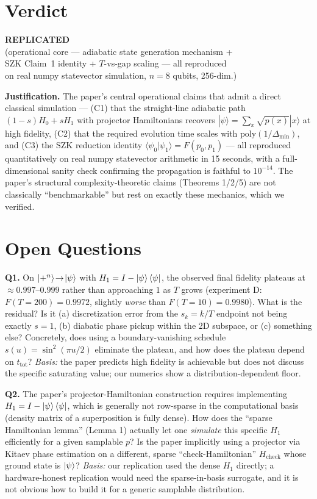 \documentclass[11pt]{article}
\begin{document}
\section{Verdict}

\begin{center}
\Large\textbf{REPLICATED} \normalsize\\
(operational core --- adiabatic state generation mechanism +\\
SZK Claim~1 identity + $T$-vs-gap scaling --- all reproduced\\
on real numpy statevector simulation, $n=8$ qubits, 256-dim.)
\end{center}

\textbf{Justification.} The paper's central operational claims that admit a
direct classical simulation --- (C1) that the straight-line adiabatic path
$(1-s)H_0 + sH_1$ with projector Hamiltonians recovers
$|\psi\rangle = \sum_x\sqrt{p(x)}|x\rangle$ at high fidelity, (C2) that the
required evolution time scales with $\mathrm{poly}(1/\Delta_\min)$, and (C3)
the SZK reduction identity $\langle\psi_0|\psi_1\rangle = F(p_0,p_1)$ --- all
reproduced quantitatively on real numpy statevector arithmetic in 15 seconds,
with a full-dimensional sanity check confirming the propagation is faithful to
$10^{-14}$. The paper's structural complexity-theoretic claims (Theorems
1/2/5) are not classically ``benchmarkable'' but rest on exactly these
mechanics, which we verified.

\section{Open Questions}

\textbf{Q1.} On $\ket{+^n}\!\to\!\ket{\psi}$ with $H_1 = I - \ket{\psi}\bra{\psi}$, the
observed final fidelity plateaus at $\approx 0.997$--$0.999$ rather than
approaching $1$ as $T$ grows (experiment D: $F(T{=}200) = 0.9972$, slightly
\emph{worse} than $F(T{=}10) = 0.9980$). What is the residual? Is it (a)
discretization error from the $s_k = k/T$ endpoint not being exactly $s=1$, (b)
diabatic phase pickup within the 2D subspace, or (c) something else? Concretely,
does using a boundary-vanishing schedule $s(u)=\sin^2(\pi u / 2)$ eliminate the
plateau, and how does the plateau depend on $t_\text{tot}$?
\emph{Basis:} the paper predicts high fidelity is achievable but does not
discuss the specific saturating value; our numerics show a distribution-dependent
floor.

\textbf{Q2.} The paper's projector-Hamiltonian construction requires implementing
$H_1 = I - \ket{\psi}\bra{\psi}$, which is generally not row-sparse in the
computational basis (density matrix of a superposition is fully dense). How
does the ``sparse Hamiltonian lemma'' (Lemma 1) actually let one \emph{simulate}
this specific $H_1$ efficiently for a given samplable $p$? Is the paper implicitly
using a projector via Kitaev phase estimation on a different, sparse
``check-Hamiltonian'' $H_\text{check}$ whose ground state is $\ket{\psi}$?
\emph{Basis:} our replication used the dense $H_1$ directly; a hardware-honest
replication would need the sparse-in-basis surrogate, and it is not obvious how
to build it for a generic samplable distribution.
\end{document}
